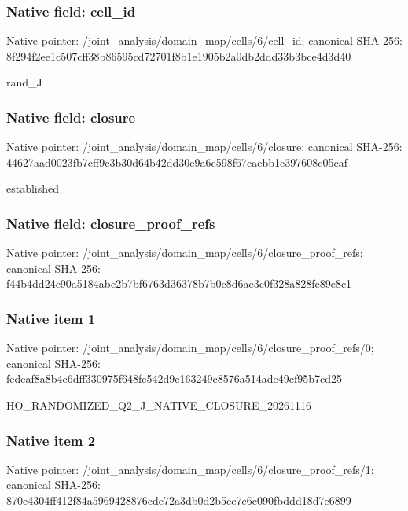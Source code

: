 \documentclass[10pt,a4paper]{article}
\begin{document}
\subsubsection{Native field: cell\_\allowbreak{}id}
Native pointer: /joint\_\allowbreak{}analysis/domain\_\allowbreak{}map/cells/6/cell\_\allowbreak{}id; canonical SHA-256: 8f294f2ee1c507cff38b86595cd72701f8b1e1905b2a0db2ddd33b3bce4d3d40

\begingroup\raggedright\sloppy rand\_\allowbreak{}J\par\endgroup

\subsubsection{Native field: closure}
Native pointer: /joint\_\allowbreak{}analysis/domain\_\allowbreak{}map/cells/6/closure; canonical SHA-256: 44627aad0023fb7cff9c3b30d64b42dd30e9a6c598f67caebb1c397608c05caf

\begingroup\raggedright\sloppy established\par\endgroup

\subsubsection{Native field: closure\_\allowbreak{}proof\_\allowbreak{}refs}
Native pointer: /joint\_\allowbreak{}analysis/domain\_\allowbreak{}map/cells/6/closure\_\allowbreak{}proof\_\allowbreak{}refs; canonical SHA-256: f44b4dd24c90a5184abe2b7bf6763d36378b7b0c8d6ae3c0f328a828fc89e8c1

\subsubsection{Native item 1}
Native pointer: /joint\_\allowbreak{}analysis/domain\_\allowbreak{}map/cells/6/closure\_\allowbreak{}proof\_\allowbreak{}refs/0; canonical SHA-256: fedeaf8a8b4c6dff330975f648fe542d9c163249c8576a514ade49cf95b7cd25

\begingroup\raggedright\sloppy HO\_\allowbreak{}RANDOMIZED\_\allowbreak{}Q2\_\allowbreak{}J\_\allowbreak{}NATIVE\_\allowbreak{}CLOSURE\_\allowbreak{}20261116\par\endgroup

\subsubsection{Native item 2}
Native pointer: /joint\_\allowbreak{}analysis/domain\_\allowbreak{}map/cells/6/closure\_\allowbreak{}proof\_\allowbreak{}refs/1; canonical SHA-256: 870e4304ff412f84a5969428876cde72a3db0d2b5cc7e6c090fbddd18d7e6899
\end{document}
